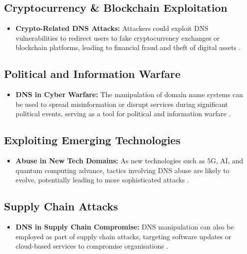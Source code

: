\subsection{Cryptocurrency \& Blockchain Exploitation}
\begin{itemize}
    \item \textbf{Crypto-Related DNS Attacks:} Attackers could exploit DNS vulnerabilities to redirect users to fake cryptocurrency exchanges or blockchain platforms, leading to financial fraud and theft of digital assets \cite{bashir2019advanced}.
\end{itemize}

\subsection{Political and Information Warfare}
\begin{itemize}
    \item \textbf{DNS in Cyber Warfare:} The manipulation of domain name systems can be used to spread misinformation or disrupt services during significant political events, serving as a tool for political and information warfare \cite{chapple2021cyberwarfare}.
\end{itemize}

\subsection{Exploiting Emerging Technologies}
\begin{itemize}
    \item \textbf{Abuse in New Tech Domains:} As new technologies such as 5G, AI, and quantum computing advance, tactics involving DNS abuse are likely to evolve, potentially leading to more sophisticated attacks \cite{brunner2021cybersecurity}.
\end{itemize}

\subsection{Supply Chain Attacks}
\begin{itemize}
    \item \textbf{DNS in Supply Chain Compromise:} DNS manipulation can also be employed as part of supply chain attacks, targeting software updates or cloud-based services to compromise organisations \cite{boyson2014cyber}.
\end{itemize}



